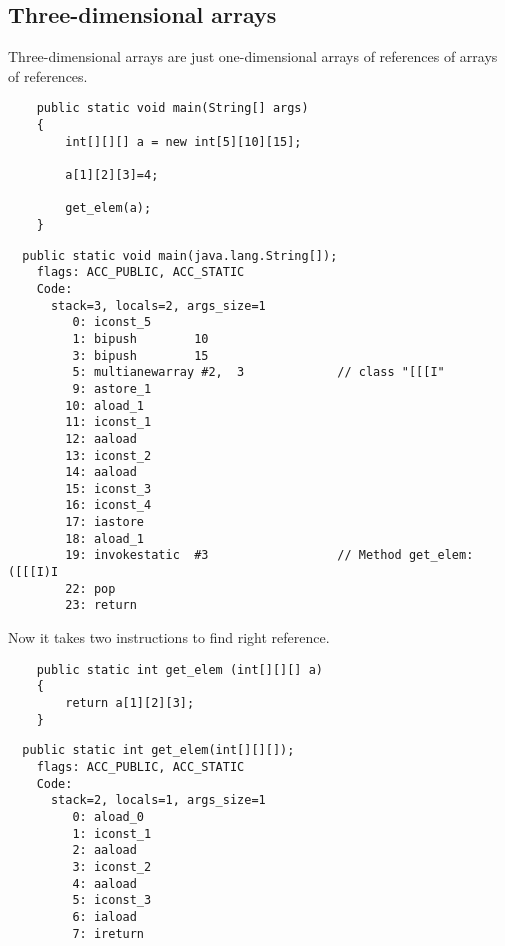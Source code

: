 \subsection{Three-dimensional arrays}

Three-dimensional arrays are just one-dimensional arrays of references of arrays of references.

\begin{lstlisting}
	public static void main(String[] args)
	{
		int[][][] a = new int[5][10][15];

		a[1][2][3]=4;

		get_elem(a);
	}
\end{lstlisting}

\begin{lstlisting}
  public static void main(java.lang.String[]);
    flags: ACC_PUBLIC, ACC_STATIC
    Code:
      stack=3, locals=2, args_size=1
         0: iconst_5      
         1: bipush        10
         3: bipush        15
         5: multianewarray #2,  3             // class "[[[I"
         9: astore_1      
        10: aload_1       
        11: iconst_1      
        12: aaload        
        13: iconst_2      
        14: aaload        
        15: iconst_3      
        16: iconst_4      
        17: iastore       
        18: aload_1       
        19: invokestatic  #3                  // Method get_elem:([[[I)I
        22: pop           
        23: return        
\end{lstlisting}

Now it takes two  instructions to find right reference.

\begin{lstlisting}
	public static int get_elem (int[][][] a)
	{
		return a[1][2][3];
	}
\end{lstlisting}

\begin{lstlisting}
  public static int get_elem(int[][][]);
    flags: ACC_PUBLIC, ACC_STATIC
    Code:
      stack=2, locals=1, args_size=1
         0: aload_0       
         1: iconst_1      
         2: aaload        
         3: iconst_2      
         4: aaload        
         5: iconst_3      
         6: iaload        
         7: ireturn       
\end{lstlisting}

